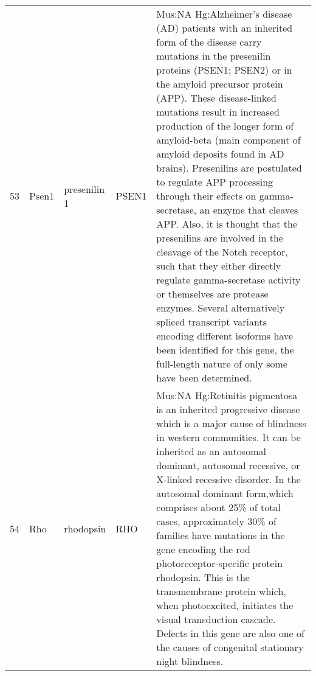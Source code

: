 \documentclass[11pt, landscape]{article}   	%
\begin{document}
\begin{table}[ht]
\begin{tabular}{rlp{3cm}lp{12cm}}
  53 & Psen1 & presenilin 1 & PSEN1 & Mus:NA Hg:Alzheimer's disease (AD) patients with an inherited form of the disease carry mutations in the presenilin proteins (PSEN1; PSEN2) or in the amyloid precursor protein (APP). These disease-linked mutations result in increased production of the longer form of amyloid-beta (main component of amyloid deposits found in AD brains). Presenilins are postulated to regulate APP processing through their effects on gamma-secretase, an enzyme that cleaves APP. Also, it is thought that the presenilins are involved in the cleavage of the Notch receptor, such that they either directly regulate gamma-secretase activity or themselves are protease enzymes. Several alternatively spliced transcript variants encoding different isoforms have been identified for this gene, the full-length nature of only some have been determined. \\ 
  54 & Rho & rhodopsin & RHO & Mus:NA Hg:Retinitis pigmentosa is an inherited progressive disease which is a major cause of blindness in western communities. It can be inherited as an autosomal dominant, autosomal recessive, or X-linked recessive disorder. In the autosomal dominant form,which comprises about 25\% of total cases, approximately 30\% of families have mutations in the gene encoding the rod photoreceptor-specific protein rhodopsin. This is the transmembrane protein which, when photoexcited, initiates the visual transduction cascade. Defects in this gene are also one of the causes of congenital stationary night blindness. \\ 
   \hline
\end{tabular}
\end{table}
\end{document}
